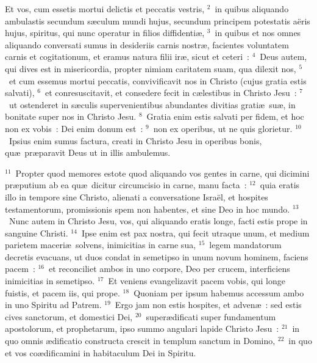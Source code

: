 \lettrine[lines=3,image=true,loversize=0.05,lraise=-0.03]{E}{}t vos, cum essetis mortui delictis et peccatis vestris,
${}^{2}$~in quibus aliquando ambulastis secundum s\ae culum mundi hujus, secundum principem potestatis a\"eris hujus, spiritus, qui nunc operatur in filios diffidenti\ae ,
${}^{3}$~in quibus et nos omnes aliquando conversati sumus in desideriis carnis nostr\ae , facientes voluntatem carnis et cogitationum, et eramus natura filii ir\ae , sicut et ceteri~:
${}^{4}$~Deus autem, qui dives est in misericordia, propter nimiam caritatem suam, qua dilexit nos,
${}^{5}$~et cum essemus mortui peccatis, convivificavit nos in Christo (cujus gratia estis salvati),
${}^{6}$~et conresuscitavit, et consedere fecit in c\ae lestibus in Christo Jesu~:
${}^{7}$~ut ostenderet in s\ae culis supervenientibus abundantes divitias grati\ae\ su\ae , in bonitate super nos in Christo Jesu.
${}^{8}$~Gratia enim estis salvati per fidem, et hoc non ex vobis~: Dei enim donum est~:
${}^{9}$~non ex operibus, ut ne quis glorietur.
${}^{10}$~Ipsius enim sumus factura, creati in Christo Jesu in operibus bonis, qu\ae\ pr\ae paravit Deus ut in illis ambulemus.


${}^{11}$~Propter quod memores estote quod aliquando vos gentes in carne, qui dicimini pr\ae putium ab ea qu\ae\ dicitur circumcisio in carne, manu facta~:
${}^{12}$~quia eratis illo in tempore sine Christo, alienati a conversatione Isra\"el, et hospites testamentorum, promissionis spem non habentes, et sine Deo in hoc mundo.
${}^{13}$~Nunc autem in Christo Jesu, vos, qui aliquando eratis longe, facti estis prope in sanguine Christi.
${}^{14}$~Ipse enim est pax nostra, qui fecit utraque unum, et medium parietem maceri\ae\ solvens, inimicitias in carne sua,
${}^{15}$~legem mandatorum decretis evacuans, ut duos condat in semetipso in unum novum hominem, faciens pacem~:
${}^{16}$~et reconciliet ambos in uno corpore, Deo per crucem, interficiens inimicitias in semetipso.
${}^{17}$~Et veniens evangelizavit pacem vobis, qui longe fuistis, et pacem iis, qui prope.
${}^{18}$~Quoniam per ipsum habemus accessum ambo in uno Spiritu ad Patrem.
${}^{19}$~Ergo jam non estis hospites, et adven\ae~: sed estis cives sanctorum, et domestici Dei,
${}^{20}$~super\ae dificati super fundamentum apostolorum, et prophetarum, ipso summo angulari lapide Christo Jesu~:
${}^{21}$~in quo omnis \ae dificatio constructa crescit in templum sanctum in Domino,
${}^{22}$~in quo et vos co\ae dificamini in habitaculum Dei in Spiritu.

